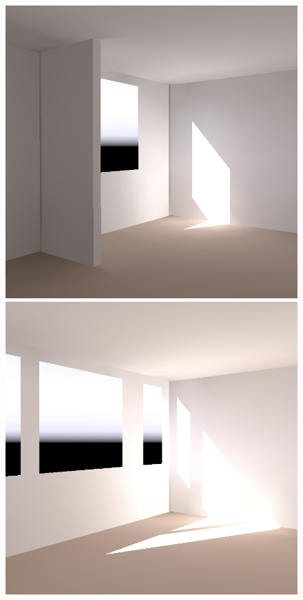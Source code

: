 \begin{figure}[t]
\hfill
\includegraphics[width=\figwidth]{p3r_031_camera_chris_march.png}   %
\includegraphics[width=\figwidth]{p3r_031_camera_chris_march_mod.png}   %
\hfill

\end{figure}
